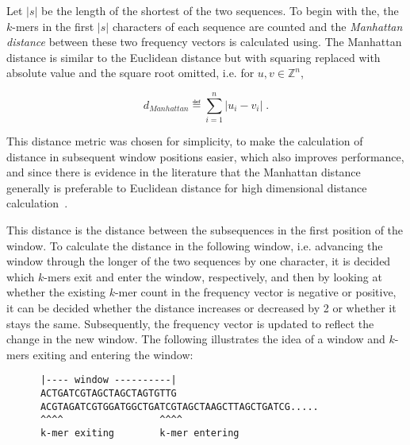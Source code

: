 Let $|s|$ be the length of the shortest of the two sequences. To begin with
the, the $k$-mers in the first $|s|$ characters of each sequence are counted
and the \emph{Manhattan distance} between these two frequency vectors is
calculated using. The Manhattan distance is similar to the Euclidean distance
but with squaring replaced with absolute value and the square root omitted,
i.e.  for $u, v \in \mathbb{Z}^n$,

\begin{equation}
  d_{Manhattan} \eqdef \sum_{i=1}^{n} |u_i - v_i| \;.
\end{equation}

This distance metric was chosen for simplicity, to make the calculation of
distance in subsequent window positions easier, which also improves
performance, and since there is evidence in the literature that the Manhattan
distance generally is preferable to Euclidean distance for high dimensional
distance calculation~\cite{aggarwal}.

This distance is the distance between the subsequences in the first position of
the window. To calculate the distance in the following window, i.e. advancing
the window through the longer of the two sequences by one character, it is
decided which $k$-mers exit and enter the window, respectively, and then by
looking at whether the existing $k$-mer count in the frequency vector is
negative or positive, it can be decided whether the distance increases or
decreased by 2 or whether it stays the same. Subsequently, the frequency vector
is updated to reflect the change in the new window. The following illustrates
the idea of a window and $k$-mers exiting and entering the window:


\begin{verbatim}
      |---- window ----------|
      ACTGATCGTAGCTAGCTAGTGTTG
      ACGTAGATCGTGGATGGCTGATCGTAGCTAAGCTTAGCTGATCG.....
      ^^^^                 ^^^^
      k-mer exiting        k-mer entering
\end{verbatim}

